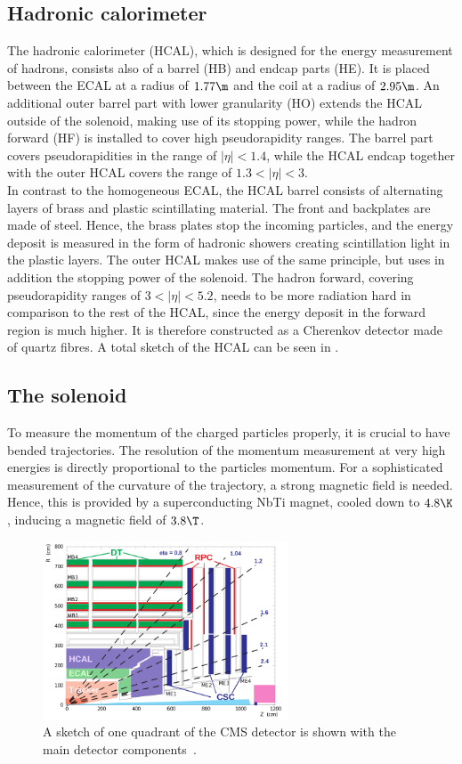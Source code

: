 \subsection{Hadronic calorimeter}
The hadronic calorimeter (HCAL), which is designed for the energy measurement of hadrons, consists also of a barrel (HB) and endcap parts (HE). It is placed between the ECAL at a radius of $1.77\m$ and the coil at a radius of $2.95\m$. An additional outer barrel part with lower granularity (HO) extends the HCAL outside of the solenoid, making use of its stopping power, while the hadron forward (HF) is installed to cover high pseudorapidity ranges. The barrel part covers pseudorapidities in the range of $|\eta|<1.4$, while the HCAL endcap together with the outer HCAL covers the range of $1.3<|\eta|<3$.\\
In contrast to the homogeneous ECAL, the HCAL barrel consists of alternating layers of brass and plastic scintillating material. The front and backplates are made of steel. Hence, the brass plates stop the incoming particles, and the energy deposit is measured in the form of hadronic showers creating scintillation light in the plastic layers. The outer HCAL makes use of the same principle, but uses in addition the stopping power of the solenoid. The hadron forward, covering pseudorapidity ranges of $3<|\eta|<5.2$, needs to be more radiation hard in comparison to the rest of the HCAL, since the energy deposit in the forward region is much higher. It is therefore constructed as a Cherenkov detector made of quartz fibres. A total sketch of the HCAL can be seen in .

\subsection{The solenoid}
To measure the momentum of the  charged particles properly, it is crucial to have bended trajectories. The resolution of the momentum measurement at very high energies is directly proportional to the particles momentum. For a sophisticated measurement of the curvature of the trajectory, a strong magnetic field is needed. Hence, this is provided by a superconducting NbTi magnet, cooled down to $4.8\K$, inducing a magnetic field of $3.8\T$.

\begin{figure}[hbtp]
 \centering
 \includegraphics[width=0.65\textwidth]{figures/general/CMS_eta.png}
 \caption{A sketch of one quadrant of the CMS detector is shown with the main detector components~\cite{CMSEta}.}
 \label{fig:etaPlaneCMSTotal}
\end{figure}

